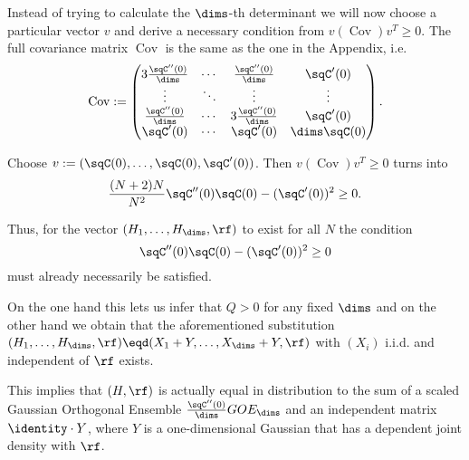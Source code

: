 Instead of trying to calculate the $\dims$-th determinant we will now choose a particular vector $v$ and derive a necessary condition from $v (\operatorname{Cov}) v^T \geq 0$. The full covariance matrix $\operatorname{Cov}$ is the same as the one in the Appendix, i.e.
\begin{align*}
    \operatorname{Cov} := 
    \begin{pmatrix}
		3\frac{\sqC''(0)}\dims &  \cdots & \frac{\sqC''(0)}\dims
		& \sqC'(0) \\
		\vdots & \ddots &\vdots & \vdots \\
		\frac{\sqC''(0)}\dims & \cdots &  3 \frac{\sqC''(0)}\dims & \sqC'(0)\\
		\sqC'(0)	& \cdots & \sqC'(0) & \dims \sqC(0)
	\end{pmatrix}.
\end{align*}

Choose $v := (\sqC(0), \ldots, \sqC(0), \sqC'(0))$. Then $v (\operatorname{Cov}) v^T \geq 0$ turns into
\begin{align*}
    \frac{(N+2)N}{N^2} \sqC''(0)\sqC(0) - (\sqC'(0))^2 \geq 0.
\end{align*}

Thus, for the vector $(H_1, \ldots, H_\dims, \rf)$ to exist for all $N$ the condition 
$$\sqC''(0)\sqC(0) - (\sqC'(0))^2 \geq 0$$
must already necessarily be satisfied.

On the one hand this lets us infer that $Q > 0$ for any fixed $\dims$ and on the other hand we obtain that the aforementioned substitution $(H_1, \ldots, H_\dims,\rf) \eqd (X_1 + Y, \ldots, X_\dims + Y,\rf)$ with $(X_i)$ i.i.d. and independent of $\rf$ exists.

This implies that $(H,\rf)$ is actually equal in distribution to the sum of a scaled Gaussian Orthogonal Ensemble $\frac{\sqC''(0)}{\dims} GOE_\dims$ and an independent matrix $\identity \cdot Y$, where $Y$ is a one-dimensional Gaussian that has a dependent joint density with $\rf$.